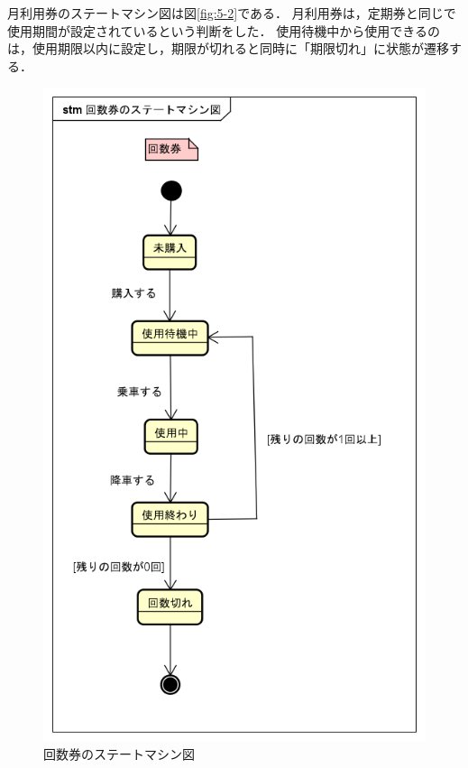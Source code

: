 \documentclass[documentclass]{jsarticle}
\begin{document}
月利用券のステートマシン図は図\ref*{fig:5-2}である．
月利用券は，定期券と同じで使用期間が設定されているという判断をした．
使用待機中から使用できるのは，使用期限以内に設定し，期限が切れると同時に「期限切れ」に状態が遷移する．
\begin{figure}[h]
  \centering
  \begin{minipage}[b]{0.49\columnwidth}
      \centering
      \includegraphics[width=0.9\columnwidth]{figure/5-1.png}
      \caption{回数券のステートマシン図}
      \label{fig:5-1}
  \end{minipage}
  \begin{minipage}[b]{0.49\columnwidth}
      \centering

\end{minipage}
\end{figure}
\end{document}
